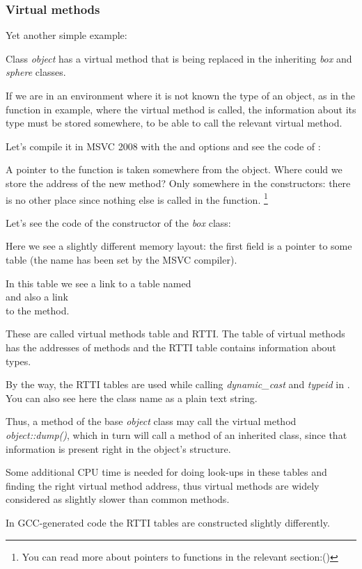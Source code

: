 \subsubsection{Virtual methods}

Yet another simple example:




Class \emph{object} has a virtual method  that is being replaced in the inheriting \emph{box} and \emph{sphere} classes.


If we are in an environment where it is not known the type of an object, as in the \main function in example,
where the virtual method  is called, the information about its type must be stored somewhere, to
be able to call the relevant virtual method.


Let's compile it in MSVC 2008 with the \Ox and \Obzero options and see the code of \main:




A pointer to the  function is taken somewhere from the object.
Where could we store the address of the new method?
Only somewhere in the constructors: there is no other place since nothing else is called in the \main function.
\footnote{You can read more about pointers to functions in the relevant section:()}


Let's see the code of the constructor of the \emph{box} class:




Here we see a slightly different memory layout:
the first field is a pointer to some table
 (the name has been set by the MSVC compiler).

\label{RTTI}

In this table we see a link to a table named \\
 and also a link\\
to the  method.

These are called virtual methods table and \ac{RTTI}.
The table of virtual methods has the addresses of methods and the \ac{RTTI} table contains information about types.

By the way, the \ac{RTTI} tables are used while calling \emph{dynamic\_cast} and \emph{typeid} in \Cpp.
You can also see here the class name as a plain text string.

Thus, a method of the base \emph{object} class may call the virtual method \emph{object::dump()}, which in turn will call
a method of an inherited class, since that information is present right in the object's structure.


Some additional CPU time is needed for doing look-ups in these tables and finding the right virtual method address, 
thus virtual methods are widely considered as slightly slower than common methods.


In GCC-generated code the \ac{RTTI} tables are constructed slightly differently.
